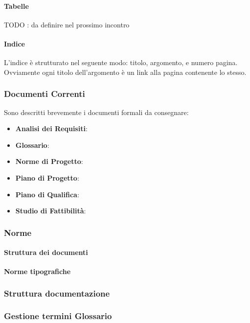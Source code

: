 \paragraph{Tabelle}
TODO : da definire nel prossimo incontro

\paragraph{Indice}
L'indice è strutturato nel seguente modo: titolo, argomento, e numero pagina. Ovviamente ogni titolo dell'argomento è un link alla pagina contenente lo stesso.

\subsubsection{Documenti Correnti}
Sono descritti brevemente i documenti formali da consegnare:
\begin{itemize}
	\item \textbf{Analisi dei Requisiti}:
	\item \textbf{Glossario}:
	\item \textbf{Norme di Progetto}:
	\item \textbf{Piano di Progetto}:
	\item \textbf{Piano di Qualifica}:
	\item \textbf{Studio di Fattibilità}:
\end{itemize}


\subsubsection{Norme}

\paragraph{Struttura dei documenti}
\paragraph{Norme tipografiche}

\subsubsection{Struttura documentazione}

\subsubsection{Gestione termini Glossario}

